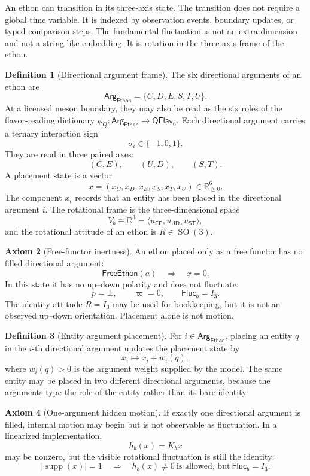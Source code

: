\documentclass[11pt]{article}
\theoremstyle{definition}
\newtheorem{definition}{Definition}[section]
\newtheorem{axiom}[definition]{Axiom}
\theoremstyle{plain}
\newcommand{\Eth}{\mathsf{Ethon}}
\newcommand{\CE}{\mathsf{CE}}
\newcommand{\UD}{\mathsf{UD}}
\newcommand{\ST}{\mathsf{ST}}
\newcommand{\Arg}{\mathsf{Arg}}
\newcommand{\FreeEth}{\mathsf{FreeEthon}}
\newcommand{\Fluc}{\mathsf{Fluc}}
\newcommand{\Qflav}{\mathsf{QFlav}}
\DeclareMathOperator{\supp}{supp}
\DeclareMathOperator{\SO}{SO}
\begin{document}
An ethon can transition in its three-axis state.  The transition does not
require a global time variable.  It is indexed by observation events,
boundary updates, or typed comparison steps.  The fundamental
fluctuation is not an extra dimension and not a string-like embedding.
It is rotation in the three-axis frame of the ethon.

\begin{definition}[Directional argument frame]
The six directional arguments of an ethon are
\[
  \Arg_{\Eth}
  =
  \{C,D,E,S,T,U\}.
\]
At a licensed meson boundary, they may also be read as the six roles of
the flavor-reading dictionary
\(\phi_Q:\Arg_{\Eth}\to\Qflav_6\).
Each directional argument carries a ternary interaction sign
\[
  \sigma_i\in\{-1,0,1\}.
\]
They are read in three paired axes:
\[
  (C,E),\qquad (U,D),\qquad (S,T).
\]
A placement state is a vector
\[
  x=(x_C,x_D,x_E,x_S,x_T,x_U)\in\mathbb R_{\geq0}^{6}.
\]
The component \(x_i\) records that an entity has been placed in the
directional argument \(i\).  The rotational frame is the three-dimensional
space
\[
  V_b\cong\mathbb R^3
  =
  \langle u_{\CE},u_{\UD},u_{\ST}\rangle,
\]
and the rotational attitude of an ethon is \(R\in\SO(3)\).
\end{definition}

\begin{axiom}[Free-functor inertness]
An ethon placed only as a free functor has no filled directional
argument:
\[
  \FreeEth(a)
  \quad\Rightarrow\quad
  x=0.
\]
In this state it has no up--down polarity and does not fluctuate:
\[
  p=\bot,
  \qquad
  \varpi=0,
  \qquad
  \Fluc_b=I_3.
\]
The identity attitude \(R=I_3\) may be used for bookkeeping, but it is
not an observed up--down orientation.  Placement alone is not motion.
\end{axiom}

\begin{definition}[Entity argument placement]
For \(i\in\Arg_{\Eth}\), placing an entity \(q\) in the \(i\)-th
directional argument updates the placement state by
\[
  x_i\mapsto x_i+w_i(q),
\]
where \(w_i(q)>0\) is the argument weight supplied by the model.  The
same entity may be placed in two different directional arguments, because
the arguments type the role of the entity rather than its bare identity.
\end{definition}

\begin{axiom}[One-argument hidden motion]
If exactly one directional argument is filled, internal motion may begin
but is not observable as fluctuation.  In a linearized implementation,
\[
  h_b(x)=K_bx
\]
may be nonzero, but the visible rotational fluctuation is still the
identity:
\[
  |\supp(x)|=1
  \quad\Rightarrow\quad
  h_b(x)\neq 0
  \ \text{is allowed, but}\
  \Fluc_b=I_3.
\]
\end{axiom}
\end{document}
